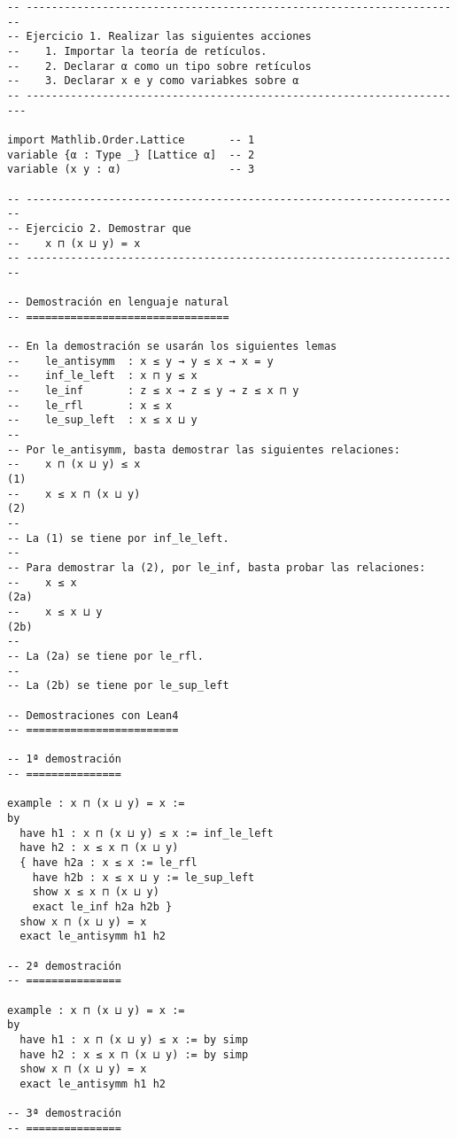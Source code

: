 \begin{verbatim}
-- ---------------------------------------------------------------------
-- Ejercicio 1. Realizar las siguientes acciones
--    1. Importar la teoría de retículos.
--    2. Declarar α como un tipo sobre retículos
--    3. Declarar x e y como variabkes sobre α
-- ----------------------------------------------------------------------

import Mathlib.Order.Lattice       -- 1
variable {α : Type _} [Lattice α]  -- 2
variable (x y : α)                 -- 3

-- ---------------------------------------------------------------------
-- Ejercicio 2. Demostrar que
--    x ⊓ (x ⊔ y) = x
-- ---------------------------------------------------------------------

-- Demostración en lenguaje natural
-- ================================

-- En la demostración se usarán los siguientes lemas
--    le_antisymm  : x ≤ y → y ≤ x → x = y
--    inf_le_left  : x ⊓ y ≤ x
--    le_inf       : z ≤ x → z ≤ y → z ≤ x ⊓ y
--    le_rfl       : x ≤ x
--    le_sup_left  : x ≤ x ⊔ y
--
-- Por le_antisymm, basta demostrar las siguientes relaciones:
--    x ⊓ (x ⊔ y) ≤ x                                                (1)
--    x ≤ x ⊓ (x ⊔ y)                                                (2)
--
-- La (1) se tiene por inf_le_left.
--
-- Para demostrar la (2), por le_inf, basta probar las relaciones:
--    x ≤ x                                                         (2a)
--    x ≤ x ⊔ y                                                     (2b)
--
-- La (2a) se tiene por le_rfl.
--
-- La (2b) se tiene por le_sup_left

-- Demostraciones con Lean4
-- ========================

-- 1ª demostración
-- ===============

example : x ⊓ (x ⊔ y) = x :=
by
  have h1 : x ⊓ (x ⊔ y) ≤ x := inf_le_left
  have h2 : x ≤ x ⊓ (x ⊔ y)
  { have h2a : x ≤ x := le_rfl
    have h2b : x ≤ x ⊔ y := le_sup_left
    show x ≤ x ⊓ (x ⊔ y)
    exact le_inf h2a h2b }
  show x ⊓ (x ⊔ y) = x
  exact le_antisymm h1 h2

-- 2ª demostración
-- ===============

example : x ⊓ (x ⊔ y) = x :=
by
  have h1 : x ⊓ (x ⊔ y) ≤ x := by simp
  have h2 : x ≤ x ⊓ (x ⊔ y) := by simp
  show x ⊓ (x ⊔ y) = x
  exact le_antisymm h1 h2

-- 3ª demostración
-- ===============


\end{verbatim}
